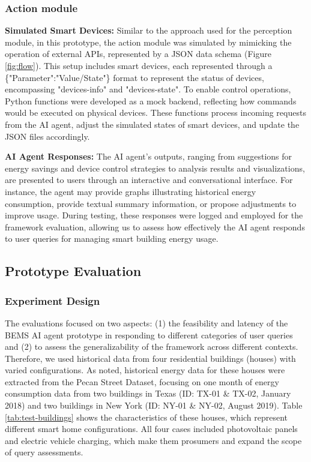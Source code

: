 \documentclass[final,3p,times]{elsarticle}
\begin{document}
\subsubsection{Action module} \label{subsec:prot. action module}

\textbf{Simulated Smart Devices:} Similar to the approach used for the perception module, in this prototype, the action module was simulated by mimicking the operation of external APIs, represented by a JSON data schema (Figure \ref{fig:flow}). This setup includes smart devices, each represented through a 
\{"Parameter":"Value/State"\} format to represent the status of devices, encompassing "devices-info" and "devices-state". To enable control operations, Python functions were developed as a mock backend, reflecting how commands would be executed on physical devices. These functions process incoming requests from the AI agent, adjust the simulated states of smart devices, and update the JSON files accordingly.

\textbf{AI Agent Responses:} The AI agent’s outputs, ranging from suggestions for energy savings and device control strategies to analysis results and visualizations, are presented to users through an interactive and conversational interface. For instance, the agent may provide graphs illustrating historical energy consumption, provide textual summary information, or propose adjustments to improve usage. During testing, these responses were logged and employed for the framework evaluation, allowing us to assess how effectively the AI agent responds to user queries for managing smart building energy usage.

\subsection{Prototype Evaluation}
\label{sec:evaluation}

\subsubsection{Experiment Design}

The evaluations focused on two aspects: (1) the feasibility and latency of the BEMS AI agent prototype in responding to different categories of user queries and (2) to assess the generalizability of the framework across different contexts. Therefore, we used historical data from four residential buildings (houses) with varied configurations. As noted, historical energy data for these houses were extracted from the Pecan Street Dataset, focusing on one month of energy consumption data from two buildings in Texas (ID: TX-01 \& TX-02, January 2018) and two buildings in New York (ID: NY-01 \& NY-02, August 2019). Table \ref{tab:test-buildings} shows the characteristics of these houses, which represent different smart home configurations. All four cases included photovoltaic panels and electric vehicle charging, which make them prosumers and expand the scope of query assessments.
\end{document}
